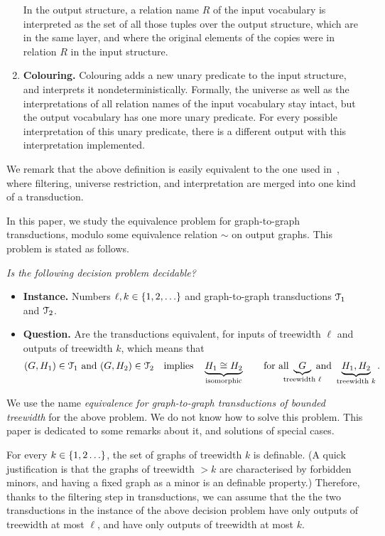 \begin{definition}
\begin{enumerate}
	In the output structure, a relation name $R$ of the input vocabulary is interpreted as the set of all those tuples over the output structure, which are in the same layer, and  where the original elements of the copies were in relation $R$
	in the input structure.
	\item {\bf Colouring.} Colouring adds  a new unary predicate to the input structure, and interprets it nondeterministically. Formally, the universe as well as the interpretations of all relation names of the input vocabulary stay intact,
	but the output vocabulary has one more unary predicate. For every possible interpretation of this unary predicate, there is a different output with this interpretation implemented.
\end{enumerate}
\end{definition}

We remark that the above definition is easily equivalent to the one used in~\cite{bojanczyk2016definability}, where filtering, universe restriction, and \mso interpretation are merged into one kind of a transduction.


 In this paper, we study the equivalence problem for \mso graph-to-graph transductions, modulo some equivalence relation $\sim$ on output graphs. This problem is stated as follows.


 {\it Is the following decision problem decidable?
     \begin{itemize}
        \item {\bf Instance.} Numbers $\ell, k \in \{1,2,\ldots\}$ and graph-to-graph \mso transductions $\mathcal T_1$ and $\mathcal T_2$.
        \item {\bf Question.} Are the transductions equivalent, for inputs of treewidth $\ell$ and outputs of treewidth $k$, which means that
        \begin{align*}
        (G,H_1) \in \Tt_1 \text{ and } (G,H_2) \in \Tt_2 \quad \text{implies} \quad \myunderbrace{H_1 \cong H_2}{isomorphic}  \qquad \text{for all }\myunderbrace{G}{treewidth $\ell$} \text{ and } \underbrace{H_1,H_2}_{\text{treewidth $k$}}.
        \end{align*}
    \end{itemize}}

We use the name \emph{equivalence for graph-to-graph \mso transductions of bounded treewidth} for the above problem. 
We do not know how to solve this problem. This paper is dedicated to some remarks about it, and solutions of special cases. 

For every $k \in \{1,2\ldots\}$, the set of graphs of treewidth $k$ is \mso definable.  (A quick justification is that the graphs of treewidth $> k$ are characterised by forbidden minors, and having a fixed graph as a minor is an \mso definable property.) Therefore, thanks to the filtering step in \mso transductions, we can assume that the the two \mso transductions in the instance of the above decision problem have only outputs of treewidth at most $\ell$, and have only outputs of treewidth at most $k$. 